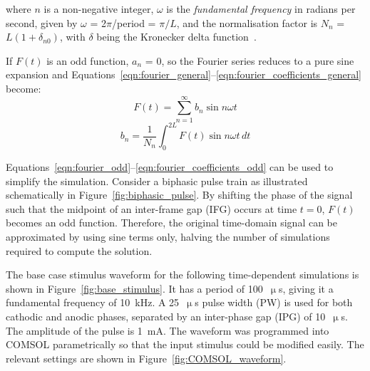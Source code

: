 \renewcommand{\arraystretch}{1.3}

where $ n $ is a non-negative integer, $ \omega $ is the \emph{fundamental
frequency} in radians per second, given by $ \omega $ = 2$ \pi $/period = $ \pi
/ L $, and the normalisation factor is $ N_n $ = $ L(1+ \delta_{n0}) $, with $
\delta $ being the Kronecker delta function~\cite{kreyszig1988}.

If $ F(t) $ is an odd function, $ a_n $ = 0, so the Fourier series reduces to a
pure sine expansion and
Equations~\ref{eqn:fourier_general}--\ref{eqn:fourier_coefficients_general}
become:\vspace{1ex}
\begin{equation}
	F(t) = \sum_{n=1}^\infty b_n \sin n \omega t
	\label{eqn:fourier_odd}
\end{equation}
\begin{equation}
	b_n = \frac{1}{N_n} \int_0^{2L} F(t) \sin n \omega t \, dt
	\label{eqn:fourier_coefficients_odd}
\end{equation}

Equations~\ref{eqn:fourier_odd}--\ref{eqn:fourier_coefficients_odd} can be used
to simplify the simulation. Consider a biphasic pulse train as illustrated
schematically in Figure~\ref{fig:biphasic_pulse}. By shifting the phase of the
signal such that the midpoint of an inter-frame gap (IFG) occurs at time $ t=0
$, $ F(t) $ becomes an odd function. Therefore, the original time-domain signal
can be approximated by using sine terms only, halving the number of simulations
required to compute the solution.

The base case stimulus waveform for the following time-dependent simulations is
shown in Figure~\ref{fig:base_stimulus}. It has a period of 100~$ \upmu $s,
giving it a fundamental frequency of 10~kHz. A 25~$ \upmu $s pulse width (PW) is
used for both cathodic and anodic phases, separated by an inter-phase gap (IPG)
of 10~$ \upmu $s. The amplitude of the pulse is 1~mA. The waveform was
programmed into COMSOL parametrically so that the input stimulus could be
modified easily. The relevant settings are shown in
Figure~\ref{fig:COMSOL_waveform}.


